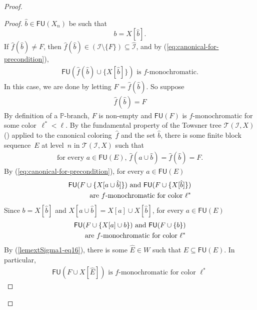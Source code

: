 \documentclass{article}
\def\PP{\mathbb{P}}
\def\Tc{\mathcal{T}}
\def\I{\mathcal{I}}
\newcommand{\NN}[0]{\mathbb{N}}
\newcommand{\Pfin}{\mathcal{P}_{\mathtt{fin}}}
\newcommand{\FU}[0]{\mathsf{FU}} %
\def\h#1{\hat{#1}}
\numberwithin{theorem}{section}
\begin{document}
\begin{proof}
\begin{proof}
$\hat b\in \FU(X_n)$
be such that
$$b = X[\h b].$$
If $\h f(\h b) \neq F$, then $\h f(\h b) \in (\I \setminus \{F\}) \subseteq \h \I$, and by (\ref{eq:canonical-for-precondition}),
\begin{align}\label{lemextSigma1-eq20}
\FU(\h f(\h b) \cup \{X[\h b]\})\text{ is $f$-monochromatic.}
\end{align}
In this case, we are done by letting $\h F = \h f(\h b)$. So suppose
\begin{align}\label{newlemextSigma1-good-color}
\h f(\h b) = F
\end{align}
By definition of a $\PP$-branch, $F$ is non-empty and $\FU(F)$ is $f$-monochromatic for some color~$\ell^* < \ell$.
By the fundamental property of the Towsner tree $\Tc(\I, X)$ () applied to the canonical coloring~$\h f$ and the set $\hat b$, there is some finite block sequence~$E$ at level~$n$ in $\Tc(\I, X)$ such that
\begin{align}\label{newlemextSigma1-eq2}
\text{for every $a \in \FU(E)$, $\h f(a \cup \h b) = \h f(\h b) = F$.} 
\end{align}
By (\ref{eq:canonical-for-precondition}), for every $a \in \FU(E)$
\begin{align}\label{newlemextSigma1-eq3}
\text{$\FU(F \cup \{X[a \cup \h b]\})$ and $\FU(F \cup \{X[\h b]\})$} \notag\\
\text{are $f$-monochromatic for color~$\ell^*$}
\end{align}
Since $b = X[\h b]$ and $X[a \cup \h b] = X[a] \cup X[\h b]$, for every $a \in \FU(E)$
\begin{align}\label{newlemextSigma1-eq5}
\text{$\FU(F \cup \{X[a] \cup b\})$ and $\FU(F \cup \{b\})$} \notag\\
\text{are $f$-monochromatic for color~$\ell^*$}
\end{align}
By (\ref{lemextSigma1-eq16}), there is some $\h E \in W$ such that $\h E \subseteq \FU(E)$. In particular, 
\begin{align}\label{newlemextSigma1-eq4}
\text{$\FU(F \cup X[\h E])$ is $f$-monochromatic for color~$\ell^*$}
\end{align}

\end{proof}
\end{proof}
\end{document}
